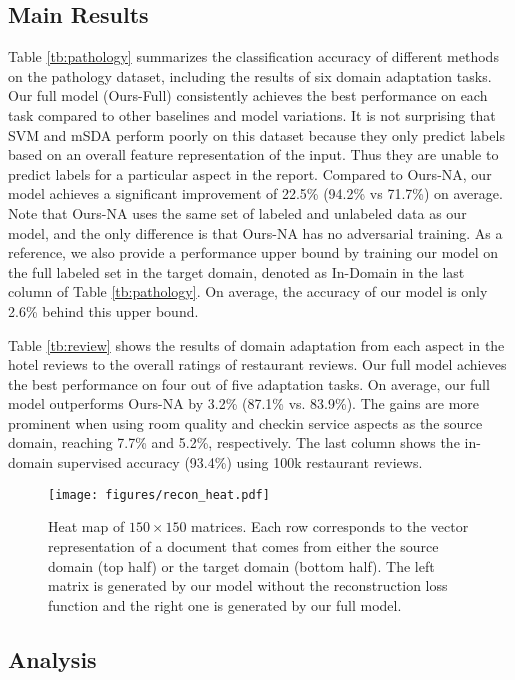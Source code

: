 \subsection{Main Results}\label{sec:main}

Table \ref{tb:pathology} summarizes the classification accuracy of different methods on the pathology dataset, including the results of six domain adaptation tasks. Our full model (Ours-Full) consistently achieves the best performance on each task compared to other baselines and model variations. It is not surprising that SVM and mSDA perform poorly on this dataset because they only predict labels based  on an overall feature representation of the input. Thus they are unable to predict labels for a particular aspect in the report. Compared to Ours-NA, our model achieves a significant improvement of 22.5\% (94.2\% vs 71.7\%) on average. Note that Ours-NA uses the same set of labeled and unlabeled data as our model, and the only difference is that Ours-NA has no adversarial training. As a reference, we also provide a performance upper bound by training our model on the full labeled set in the target domain, denoted as In-Domain in the last column of Table \ref{tb:pathology}. On average, the accuracy of our model is only 2.6\% behind this upper bound.

Table \ref{tb:review} shows the results of domain adaptation from each aspect in the hotel reviews to the overall ratings of restaurant reviews. Our full model achieves the best performance on four out of five adaptation tasks. On average, our full model outperforms Ours-NA by 3.2\% (87.1\% vs. 83.9\%). The gains are more prominent when using room quality and checkin service aspects as the source domain, reaching 7.7\% and 5.2\%, respectively. The last column shows the in-domain supervised accuracy (93.4\%) using 100k restaurant reviews. 

\begin{figure}[t]
\centering
\texttt{[image: figures/recon\_heat.pdf]}
\caption{Heat map of $150\times 150$ matrices. Each row corresponds to the vector representation of a document that comes from either the source domain (top half) or the target domain (bottom half). The left matrix is generated by our model without the reconstruction loss function and the right one is generated by our full model.}\label{fig:heat}
\end{figure}


\subsection{Analysis}\label{sec:analysis}

